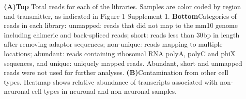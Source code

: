 \textbf{(A)Top} Total reads for each of the libraries. Samples are color coded by region and transmitter, as indicated in Figure 1 Supplement 1.
\textbf{Bottom}Categories of reads in each library: unmapped: reads that did not map to the mm10 genome including chimeric and back-spliced reads; short: reads less than 30bp in length after removing adaptor sequences; non-unique: reads mapping to multiple locations; abundant: reads containing ribosomal RNA polyA, polyC and phiX sequences, and unique: uniquely mapped reads. Abundant, short and unmapped reads were not used for further analyses. 
\textbf{(B)}Contamination from other cell types. Heatmap shows relative abundance of transcripts associated with non-neuronal cell types in neuronal and non-neuronal samples. 